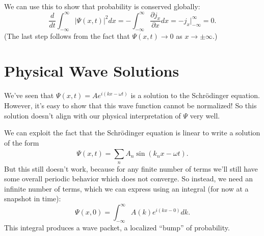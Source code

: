\documentclass[../p052main.tex]{subfiles}
\begin{document}
We can use this to show that probability is conserved globally:
\[ \frac{d}{dt} \int_{-\infty}^{\infty} |\Psi(x,t)|^2 dx = -\int_{-\infty}^{\infty} \frac{\partial j_x}{\partial x}dx = -j_x \Big|_{-\infty}^\infty = 0. \]
(The last step follows from the fact that $\Psi(x,t) \to 0$ as $x \to \pm \infty$.)



\section{Physical Wave Solutions}
We've seen that $\Psi(x,t) = Ae^{i(kx - \omega t)}$ is a solution to the Schrödinger equation.
However, it's easy to show that this wave function cannot be normalized!
So this solution doesn't align with our physical interpretation of $\Psi$ very well.

We can exploit the fact that the Schrödinger equation is linear to write a solution of the form
\[ \Psi(x,t) = \sum_{n}^{} A_n \sin (k_n x - \omega t). \]
But this still doesn't work, because for any finite number of terms we'll still have some overall periodic behavior which does not converge.
So instead, we need an infinite number of terms, which we can express using an integral (for now at a snapshot in time):
\[ \Psi(x,0) = \int_{-\infty}^{\infty} A(k) e^{i(kx - 0)}dk. \]
This integral produces a wave packet, a localized ``bump'' of probability.
\end{document}
